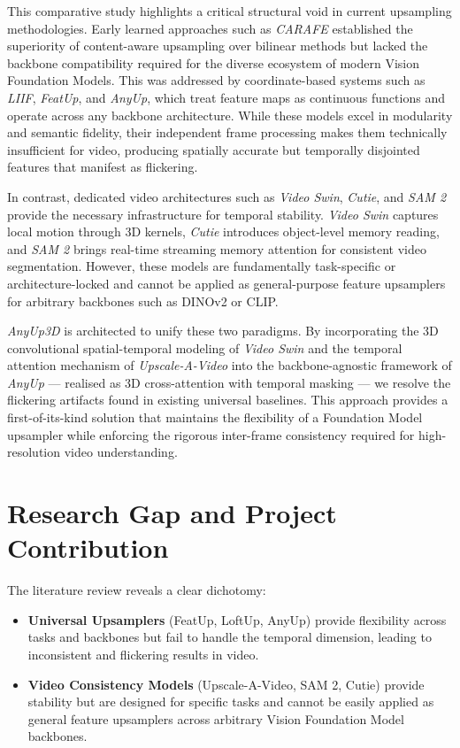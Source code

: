 This comparative study highlights a critical structural void
in current upsampling methodologies.
Early learned approaches such as \textit{CARAFE} established
the superiority of content-aware upsampling over bilinear
methods but lacked the backbone compatibility required for the
diverse ecosystem of modern Vision Foundation Models.
This was addressed by coordinate-based systems such as
\textit{LIIF}, \textit{FeatUp}, and \textit{AnyUp}, which
treat feature maps as continuous functions and operate across
any backbone architecture.
While these models excel in modularity and semantic fidelity,
their independent frame processing makes them technically
insufficient for video, producing spatially accurate but
temporally disjointed features that manifest as flickering.

In contrast, dedicated video architectures such as
\textit{Video Swin}, \textit{Cutie}, and \textit{SAM 2}
provide the necessary infrastructure for temporal stability.
\textit{Video Swin} captures local motion through 3D kernels,
\textit{Cutie} introduces object-level memory reading, and
\textit{SAM 2} brings real-time streaming memory attention
for consistent video segmentation.
However, these models are fundamentally task-specific or
architecture-locked and cannot be applied as general-purpose
feature upsamplers for arbitrary backbones such as DINOv2 or
CLIP\@.

\textit{AnyUp3D} is architected to unify these two
paradigms.
By incorporating the 3D convolutional spatial-temporal modeling
of \textit{Video Swin} and the temporal attention mechanism of
\textit{Upscale-A-Video} into the backbone-agnostic framework
of \textit{AnyUp} --- realised as 3D cross-attention with
temporal masking --- we resolve the flickering artifacts found
in existing universal baselines.
This approach provides a first-of-its-kind solution that
maintains the flexibility of a Foundation Model upsampler
while enforcing the rigorous inter-frame consistency required
for high-resolution video understanding.


\section{Research Gap and Project Contribution}

The literature review reveals a clear dichotomy:
\begin{itemize}
  \item \textbf{Universal Upsamplers} (FeatUp, LoftUp, AnyUp)
        provide flexibility across tasks and backbones but fail
        to handle the temporal dimension, leading to
        inconsistent and flickering results in video.
  \item \textbf{Video Consistency Models}
        (Upscale-A-Video, SAM 2, Cutie) provide stability but
        are designed for specific tasks and cannot be easily
        applied as general feature upsamplers across arbitrary
        Vision Foundation Model backbones.
\end{itemize}

